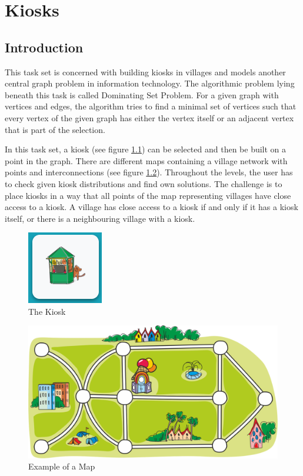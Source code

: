 \chapter{Kiosks}
\label{chapter:kiosks}

\section{Introduction}
\label{section:introduction}
This task set is concerned with building kiosks in villages and models another central graph problem in information technology. The algorithmic problem lying beneath this task is called Dominating Set Problem. For a given graph with vertices and edges, the algorithm tries to find a minimal set of vertices such that every vertex of the given graph has either the vertex itself or an adjacent vertex that is part of the selection.

In this task set, a kiosk (see figure \ref{fig:kiosk}) can be selected and then be built on a point in the graph. There are different maps containing a village network with points and interconnections (see figure \ref{fig:kioskExample}).
Throughout the levels, the user has to check given kiosk distributions and find own solutions. The challenge is to place kiosks in a way that all points of the map representing villages have close access to a kiosk. A village has close access to a kiosk if and only if it has a kiosk itself, or there is a neighbouring village with a kiosk.

\begin{figure}[H]
    \centering
    \includegraphics[width=0.2 \columnwidth]{figures/kiosk.png}
    \caption{The Kiosk} 
    \label{fig:kiosk} 
\end{figure}

\begin{figure}[H]
    \centering
    \includegraphics[width=1.0 \columnwidth]{figures/kiosk_example.png}
    \caption{Example of a Map} 
    \label{fig:kioskExample} 
\end{figure}


